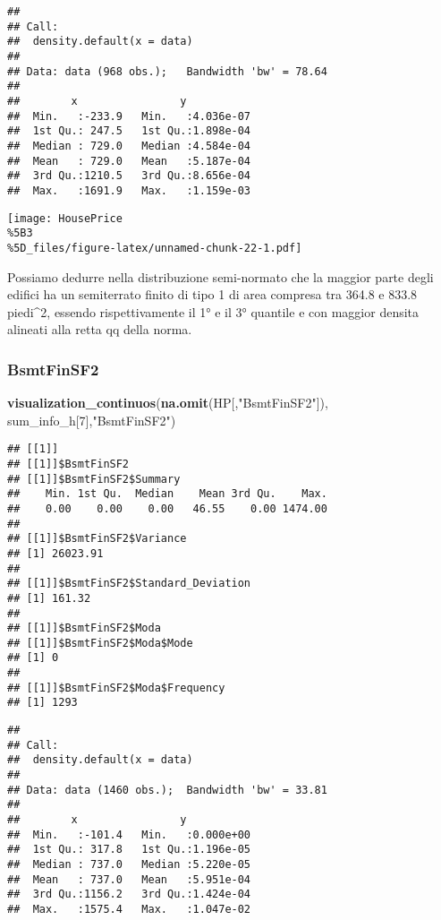 \documentclass[
]{article}
\newenvironment{Shaded}{\begin{snugshade}}{\end{snugshade}}
\newcommand{\DecValTok}[1]{\textcolor[rgb]{0.00,0.00,0.81}{#1}}
\newcommand{\FunctionTok}[1]{\textcolor[rgb]{0.13,0.29,0.53}{\textbf{#1}}}
\newcommand{\NormalTok}[1]{#1}
\newcommand{\StringTok}[1]{\textcolor[rgb]{0.31,0.60,0.02}{#1}}
\begin{document}
\begin{verbatim}
## 
## Call:
##  density.default(x = data)
## 
## Data: data (968 obs.);   Bandwidth 'bw' = 78.64
## 
##        x                y            
##  Min.   :-233.9   Min.   :4.036e-07  
##  1st Qu.: 247.5   1st Qu.:1.898e-04  
##  Median : 729.0   Median :4.584e-04  
##  Mean   : 729.0   Mean   :5.187e-04  
##  3rd Qu.:1210.5   3rd Qu.:8.656e-04  
##  Max.   :1691.9   Max.   :1.159e-03
\end{verbatim}

\texttt{[image: HousePrice\\\%5B3\\\%5D\_files/figure-latex/unnamed-chunk-22-1.pdf]}

Possiamo dedurre nella distribuzione semi-normato che la maggior parte
degli edifici ha un semiterrato finito di tipo 1 di area compresa tra
364.8 e 833.8 piedi\^{}2, essendo rispettivamente il 1° e il 3° quantile
e con maggior densita alineati alla retta qq della norma.

\subsubsection{BsmtFinSF2}\label{bsmtfinsf2}

\begin{Shaded}
\begin{Highlighting}[]
\FunctionTok{visualization\_continuos}\NormalTok{(}\FunctionTok{na.omit}\NormalTok{(HP[,}\StringTok{"BsmtFinSF2"}\NormalTok{]), sum\_info\_h[}\DecValTok{7}\NormalTok{],}\StringTok{"BsmtFinSF2"}\NormalTok{)}
\end{Highlighting}
\end{Shaded}

\begin{verbatim}
## [[1]]
## [[1]]$BsmtFinSF2
## [[1]]$BsmtFinSF2$Summary
##    Min. 1st Qu.  Median    Mean 3rd Qu.    Max. 
##    0.00    0.00    0.00   46.55    0.00 1474.00 
## 
## [[1]]$BsmtFinSF2$Variance
## [1] 26023.91
## 
## [[1]]$BsmtFinSF2$Standard_Deviation
## [1] 161.32
## 
## [[1]]$BsmtFinSF2$Moda
## [[1]]$BsmtFinSF2$Moda$Mode
## [1] 0
## 
## [[1]]$BsmtFinSF2$Moda$Frequency
## [1] 1293
\end{verbatim}

\begin{verbatim}
## 
## Call:
##  density.default(x = data)
## 
## Data: data (1460 obs.);  Bandwidth 'bw' = 33.81
## 
##        x                y            
##  Min.   :-101.4   Min.   :0.000e+00  
##  1st Qu.: 317.8   1st Qu.:1.196e-05  
##  Median : 737.0   Median :5.220e-05  
##  Mean   : 737.0   Mean   :5.951e-04  
##  3rd Qu.:1156.2   3rd Qu.:1.424e-04  
##  Max.   :1575.4   Max.   :1.047e-02
\end{verbatim}
\end{document}
